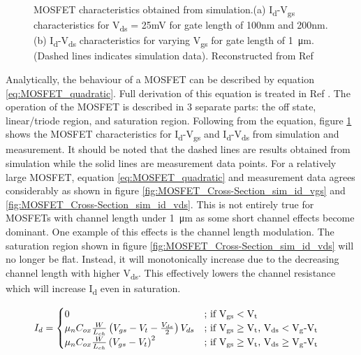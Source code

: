 \documentclass[11pt,a4paper]{report}
\begin{document}
\begin{figure}
\begin{minipage}{.5\linewidth}
\end{minipage}\par\medskip
\caption{MOSFET characteristics obtained from simulation.(a) I\textsubscript{d}-V\textsubscript{gs} characteristics for V\textsubscript{ds} = 25mV for gate length of 100nm and 200nm.(b) I\textsubscript{d}-V\textsubscript{ds} characteristics for varying V\textsubscript{gs} for gate length of \SI{1}{\micro\metre}.(Dashed lines indicates simulation data). Reconstructed from Ref \cite{Semiconductor_explained_more}}
\label{fig:MOSFET_Cross-Section_sim}
\end{figure}

Analytically, the behaviour of a MOSFET can be described by equation \ref{eq:MOSFET_quadratic}. Full derivation of this equation is treated in Ref \cite{Semiconductor_explained_more}. The operation of the MOSFET is described in 3 separate parts: the off state, linear/triode region, and saturation region. Following from the equation, figure \ref{fig:MOSFET_Cross-Section_sim} shows the MOSFET characteristics for I\textsubscript{d}-V\textsubscript{gs} and I\textsubscript{d}-V\textsubscript{ds} from simulation and measurement. It should be noted that the dashed lines are results obtained from simulation while the solid lines are measurement data points. For a relatively large MOSFET, equation \ref{eq:MOSFET_quadratic} and measurement data agrees considerably as shown in figure \ref{fig:MOSFET_Cross-Section_sim_id_vgs} and \ref{fig:MOSFET_Cross-Section_sim_id_vds}. This is not entirely true for MOSFETs with channel length under \SI{1}{\micro\metre} as some short channel effects become dominant. One example of this effects is the channel length modulation. The saturation region shown in figure \ref{fig:MOSFET_Cross-Section_sim_id_vds} will no longer be flat. Instead, it will monotonically increase due to the decreasing channel length with higher V\textsubscript{ds}. This effectively lowers the channel resistance which will increase I\textsubscript{d} even in saturation.

\begin{align}
     I_{d} &=
  \begin{cases}
   0        & \text{; if V\textsubscript{gs}} < \text{V\textsubscript{t}} \\
   \mu_n C_{ox}\frac{W}{L_{ch}}\left(V_{gs} - V_t - \frac{V_{ds}}{2}\right)V_{ds} & \text{; if V\textsubscript{gs}} \geq  \text{V\textsubscript{t}, V\textsubscript{ds}} <  \text{V\textsubscript{g}-V\textsubscript{t}} \\ 
   \mu_n C_{ox}\frac{W}{L_{ch}}\left(V_{gs} - V_t\right)^2 & \text{; if V\textsubscript{gs}} \geq  \text{V\textsubscript{t}, V\textsubscript{ds}} \geq \text{V\textsubscript{g}-V\textsubscript{t}}
  \end{cases}
  \label{eq:MOSFET_quadratic}
\end{align}
\end{document}
